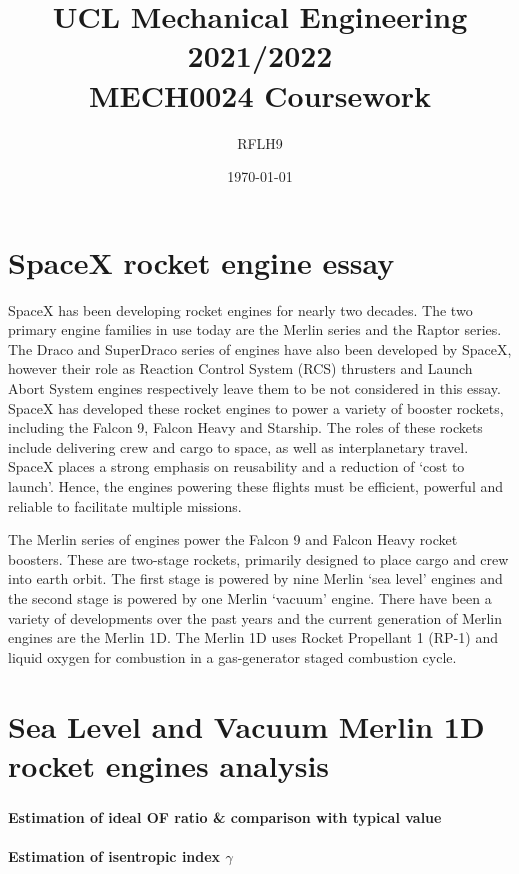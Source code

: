 \documentclass[11pt]{article}
\numberwithin{equation}{section}
\begin{document}
\title{\textbf{UCL Mechanical Engineering 2021/2022}\\MECH0024 Coursework}
\author{RFLH9}
\date{\today}
\maketitle
\tableofcontents
\listoffigures
\newpage
\part{SpaceX rocket engine essay}
SpaceX has been developing rocket engines for nearly two decades. The two primary engine families in use today are the Merlin series and the Raptor series. The Draco and SuperDraco series of engines have also been developed by SpaceX, however their role as Reaction Control System (RCS) thrusters and Launch Abort System engines respectively leave them to be not considered in this essay. SpaceX has developed these rocket engines to power a variety of booster rockets, including the Falcon 9, Falcon Heavy and Starship. The roles of these rockets include delivering crew and cargo to space, as well as interplanetary travel. SpaceX places a strong emphasis on reusability and a reduction of `cost to launch'. Hence, the engines powering these flights must be efficient, powerful and reliable to facilitate multiple missions.

The Merlin series of engines power the Falcon 9 and Falcon Heavy rocket boosters. These are two-stage rockets, primarily designed to place cargo and crew into earth orbit. The first stage is powered by nine Merlin `sea level' engines and the second stage is powered by one Merlin `vacuum' engine. There have been a variety of developments over the past years and the current generation of Merlin engines are the Merlin 1D. The Merlin 1D uses Rocket Propellant 1 (RP-1) and liquid oxygen for combustion in a gas-generator staged combustion cycle.
\part{Sea Level and Vacuum Merlin 1D rocket engines analysis}
\section{}
\subsection{Estimation of ideal OF ratio \& comparison with typical value}
\subsection{Estimation of isentropic index $\gamma$}
\end{document}
